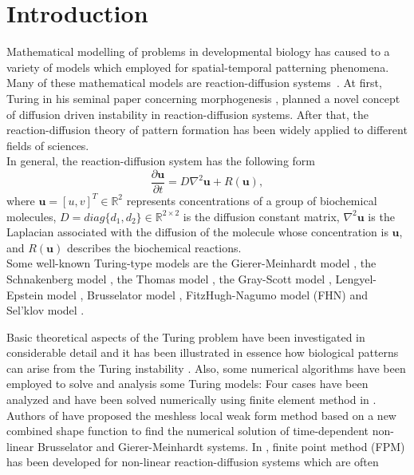 \documentclass[12pt]{article}
\numberwithin{equation}{section}
\begin{document}
\section{Introduction}
Mathematical modelling of problems in developmental biology
has caused to a variety of models which employed for spatial-temporal patterning phenomena.  Many of these mathematical models are reaction-diffusion systems~\cite{WazwazBook}.
At first, Turing in his seminal paper concerning morphogenesis \cite{Turing1}, planned a novel concept of diffusion driven instability in reaction-diffusion systems. After that, the reaction-diffusion theory of pattern formation has been widely
applied to different fields of sciences.\\
In general, the reaction-diffusion system has the following form
\begin{equation}\label{RDO}
\frac{{\partial {\mathbf{u}}}}{{\partial t}} = D{\nabla ^2}{\mathbf{u}} + R({\mathbf{u}}),\end{equation}
where ${\mathbf{u}}=[u,v]^T\in{\mathbb{R}}^{2}$
represents concentrations of a group of biochemical molecules,
  $D=diag\{d_1,d_2\}\in{\mathbb{R}}^{2\times 2}$
is the diffusion constant
matrix, ${\nabla ^2}{\mathbf{u}}$
is the Laplacian associated with the diffusion of the molecule whose concentration is ${\mathbf{u}}$, and $R({\mathbf{u}})$ describes the biochemical reactions.\\
Some well-known Turing-type models are the Gierer-Meinhardt model \cite{Gierer}, the Schnakenberg model \cite{Schnak}, the
Thomas model \cite{Thomas}, the Gray-Scott model \cite{Gray1,Gray2}, Lengyel-Epstein model \cite{Lengyel}, Brusselator model \cite{Prigogine}, FitzHugh-Nagumo model (FHN) \cite{Fitz1,Fitz2, Nagu} and Sel'klov model \cite{Selkov}.
\par
Basic theoretical aspects of the Turing problem have been investigated in considerable detail \cite{Borckmans, De, Walgraef} and it has been
illustrated in essence how biological patterns can arise from the Turing instability \cite{Murray}. Also, some numerical algorithms
have been employed to solve and analysis some Turing models:
Four cases have been analyzed and
have been solved numerically using finite element method in \cite{Garz}. Authors of \cite{Ilati} have proposed the meshless local weak form method based on a new combined shape function to find the numerical solution of time-dependent non-linear Brusselator and Gierer-Meinhardt systems.
In \cite{Tatari}, finite
point method (FPM)  has been developed for non-linear reaction-diffusion systems which are often
\end{document}
